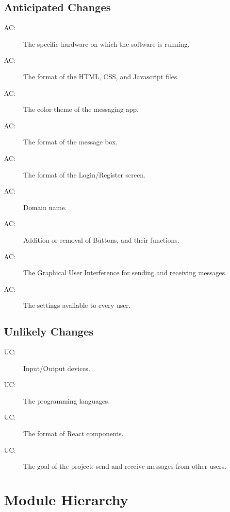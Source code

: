 \documentclass[12pt, titlepage]{article}
\newcounter{acnum}
\newcommand{\actheacnum}{AC\theacnum}
\newcounter{ucnum}
\newcommand{\uctheucnum}{UC\theucnum}
\begin{document}
\subsection{Anticipated Changes} \label{SecAchange}
\begin{description}
\item[ \actheacnum \label{acHardware}:] The specific hardware on which the software is running.
\item[ \actheacnum \label{acInput}:] The format of the HTML, CSS, and Javascript files.
\item[ \actheacnum \label{acInput}:] The color theme of the messaging app.
\item[ \actheacnum \label{acInput}:] The format of the message box.
\item[ \actheacnum \label{acInput}:] The format of the Login/Register screen.
\item[ \actheacnum \label{acInput}:] Domain name.
\item[ \actheacnum \label{acInput}:] Addition or removal of Buttons, and their functions.
\item[ \actheacnum \label{acInput}:] The Graphical User Interference for sending and receiving messages.
\item[ \actheacnum \label{acInput}:] The settings available to every user.
\end{description}

\subsection{Unlikely Changes} \label{SecUchange}
\begin{description}
\item[ \uctheucnum \label{ucIO}:] Input/Output devices.
\item[ \uctheucnum \label{ucIO}:] The programming languages.
\item[ \uctheucnum \label{ucIO}:] The format of React components.
\item[ \uctheucnum \label{ucIO}:] The goal of the project: send and receive messages from other users.
\end{description}

\section{Module Hierarchy} \label{SecMH}
\end{document}

